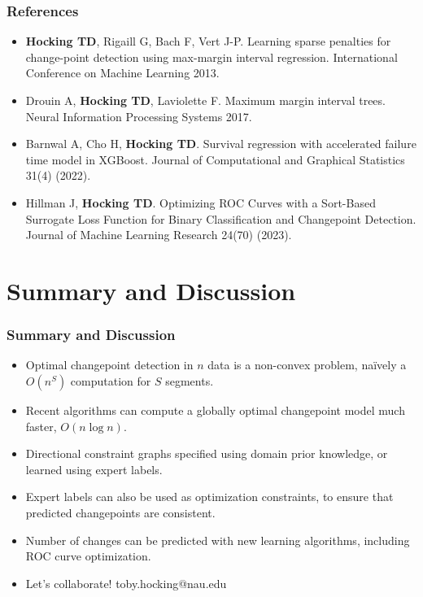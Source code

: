 \documentclass{beamer}
\begin{document}
\begin{frame}
  \frametitle{References}
  \scriptsize
  \begin{itemize}
  \item \textbf{Hocking TD}, Rigaill G, Bach F, Vert J-P. Learning
    sparse penalties for change-point detection using max-margin
    interval regression. International Conference on Machine Learning
    2013.
  \item Drouin A, \textbf{Hocking TD}, Laviolette F. Maximum margin interval
    trees. Neural Information Processing Systems 2017.
  \item Barnwal A, Cho H, \textbf{Hocking TD}. Survival regression with
    accelerated failure time model in XGBoost. Journal of Computational and Graphical Statistics 31(4) (2022).
  \item Hillman J, \textbf{Hocking TD}. Optimizing ROC Curves with a
    Sort-Based Surrogate Loss Function for Binary Classification and
    Changepoint Detection. Journal of Machine Learning Research 24(70)
    (2023).
  \end{itemize}
\end{frame}

\section{Summary and Discussion}

\begin{frame}[fragile]
  \frametitle{Summary and Discussion}

  \begin{itemize}
  \item Optimal changepoint detection in $n$ data is a non-convex
    problem, na\" ively a $O(n^S)$ computation for $S$ segments.
  \item Recent algorithms can compute a globally optimal changepoint
    model much faster, $O(n\log n)$.
  \item Directional constraint graphs specified using domain prior
    knowledge, or learned using expert labels.
  \item Expert labels can also be used as optimization constraints, to
    ensure that predicted changepoints are consistent.
  \item Number of changes can be predicted with new learning
    algorithms, including ROC curve optimization.
  \item Let's collaborate! toby.hocking@nau.edu
  \end{itemize}
  
\end{frame}
\end{document}
